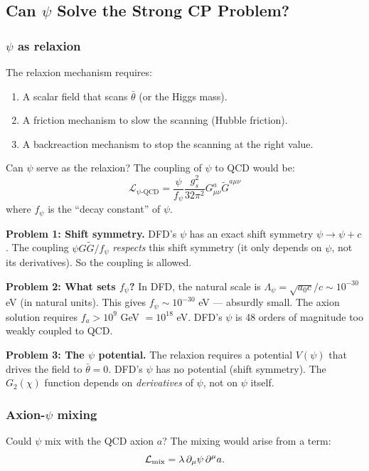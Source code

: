 \documentclass[11pt,a4paper]{article}
\begin{document}
\subsection{Can $\psi$ Solve the Strong CP Problem?}

\subsubsection{$\psi$ as relaxion}

The relaxion mechanism requires:
\begin{enumerate}
\item A scalar field that scans $\bar\theta$ (or the Higgs mass).
\item A friction mechanism to slow the scanning (Hubble friction).
\item A backreaction mechanism to stop the scanning at the right value.
\end{enumerate}

Can $\psi$ serve as the relaxion? The coupling of $\psi$ to QCD would be:
\begin{equation}
\mathcal{L}_{\psi\text{-QCD}} = \frac{\psi}{f_\psi}\frac{g_s^2}{32\pi^2}G_{\mu\nu}^a\tilde{G}^{a\mu\nu}
\end{equation}
where $f_\psi$ is the ``decay constant'' of $\psi$.

\textbf{Problem 1: Shift symmetry.} DFD's $\psi$ has an exact shift symmetry $\psi \to \psi + c$. The coupling $\psi G\tilde{G}/f_\psi$ \emph{respects} this shift symmetry (it only depends on $\psi$, not its derivatives). So the coupling is allowed.

\textbf{Problem 2: What sets $f_\psi$?} In DFD, the natural scale is $\Lambda_\psi = \sqrt{a_0 c}/c \sim 10^{-30}$ eV (in natural units). This gives $f_\psi \sim 10^{-30}$ eV --- absurdly small. The axion solution requires $f_a > 10^9$ GeV $= 10^{18}$ eV. DFD's $\psi$ is 48 orders of magnitude too weakly coupled to QCD.

\textbf{Problem 3: The $\psi$ potential.} The relaxion requires a potential $V(\psi)$ that drives the field to $\bar\theta = 0$. DFD's $\psi$ has no potential (shift symmetry). The $G_2(\chi)$ function depends on \emph{derivatives} of $\psi$, not on $\psi$ itself.

\subsubsection{Axion-$\psi$ mixing}

Could $\psi$ mix with the QCD axion $a$? The mixing would arise from a term:
\begin{equation}
\mathcal{L}_{\rm mix} = \lambda\,\partial_\mu\psi\,\partial^\mu a.
\end{equation}
\end{document}
